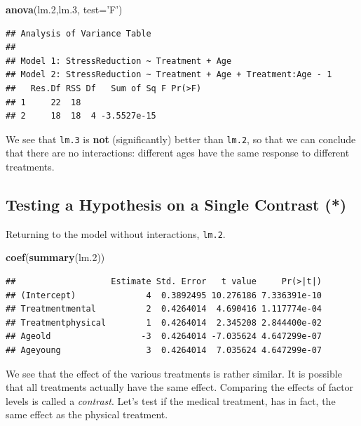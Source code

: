 \documentclass[]{book}
\newenvironment{Shaded}{\begin{snugshade}}{\end{snugshade}}
\newcommand{\KeywordTok}[1]{\textcolor[rgb]{0.13,0.29,0.53}{\textbf{#1}}}
\newcommand{\DataTypeTok}[1]{\textcolor[rgb]{0.13,0.29,0.53}{#1}}
\newcommand{\DecValTok}[1]{\textcolor[rgb]{0.00,0.00,0.81}{#1}}
\newcommand{\StringTok}[1]{\textcolor[rgb]{0.31,0.60,0.02}{#1}}
\newcommand{\NormalTok}[1]{#1}
\theoremstyle{definition}
\theoremstyle{definition}
\theoremstyle{definition}
\theoremstyle{remark}
\begin{document}
\begin{Shaded}
\begin{Highlighting}[]
\KeywordTok{anova}\NormalTok{(lm.}\DecValTok{2}\NormalTok{,lm.}\DecValTok{3}\NormalTok{, }\DataTypeTok{test=}\StringTok{'F'}\NormalTok{)}
\end{Highlighting}
\end{Shaded}

\begin{verbatim}
## Analysis of Variance Table
## 
## Model 1: StressReduction ~ Treatment + Age
## Model 2: StressReduction ~ Treatment + Age + Treatment:Age - 1
##   Res.Df RSS Df   Sum of Sq F Pr(>F)
## 1     22  18                        
## 2     18  18  4 -3.5527e-15
\end{verbatim}

We see that \texttt{lm.3} is \textbf{not} (significantly) better than
\texttt{lm.2}, so that we can conclude that there are no interactions:
different ages have the same response to different treatments.

\subsection{Testing a Hypothesis on a Single Contrast
(*)}\label{testing-a-hypothesis-on-a-single-contrast}

Returning to the model without interactions, \texttt{lm.2}.

\begin{Shaded}
\begin{Highlighting}[]
\KeywordTok{coef}\NormalTok{(}\KeywordTok{summary}\NormalTok{(lm.}\DecValTok{2}\NormalTok{))}
\end{Highlighting}
\end{Shaded}

\begin{verbatim}
##                   Estimate Std. Error   t value     Pr(>|t|)
## (Intercept)              4  0.3892495 10.276186 7.336391e-10
## Treatmentmental          2  0.4264014  4.690416 1.117774e-04
## Treatmentphysical        1  0.4264014  2.345208 2.844400e-02
## Ageold                  -3  0.4264014 -7.035624 4.647299e-07
## Ageyoung                 3  0.4264014  7.035624 4.647299e-07
\end{verbatim}

We see that the effect of the various treatments is rather similar. It
is possible that all treatments actually have the same effect. Comparing
the effects of factor levels is called a \emph{contrast}. Let's test if
the medical treatment, has in fact, the same effect as the physical
treatment.
\end{document}
